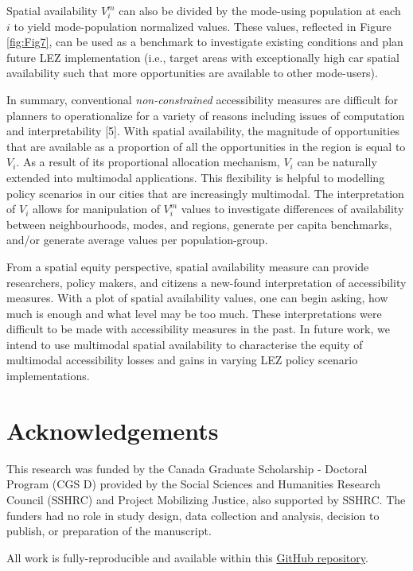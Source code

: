 \documentclass[10pt,letterpaper]{article}
\begin{document}
Spatial availability \(V_i^m\) can also be divided by the mode-using
population at each \(i\) to yield mode-population normalized values.
These values, reflected in Figure \ref{fig:Fig7}, can be used as a
benchmark to investigate existing conditions and plan future LEZ
implementation (i.e., target areas with exceptionally high car spatial
availability such that more opportunities are available to other
mode-users).

In summary, conventional \emph{non-constrained} accessibility measures
are difficult for planners to operationalize for a variety of reasons
including issues of computation and interpretability {[}5{]}. With
spatial availability, the magnitude of opportunities that are available
as a proportion of all the opportunities in the region is equal to
\(V_i\). As a result of its proportional allocation mechanism, \(V_i\)
can be naturally extended into multimodal applications. This flexibility
is helpful to modelling policy scenarios in our cities that are
increasingly multimodal. The interpretation of \(V_i\) allows for
manipulation of \(V_i^m\) values to investigate differences of
availability between neighbourhoods, modes, and regions, generate per
capita benchmarks, and/or generate average values per population-group.

From a spatial equity perspective, spatial availability measure can
provide researchers, policy makers, and citizens a new-found
interpretation of accessibility measures. With a plot of spatial
availability values, one can begin asking, how much is enough and what
level may be too much. These interpretations were difficult to be made
with accessibility measures in the past. In future work, we intend to
use multimodal spatial availability to characterise the equity of
multimodal accessibility losses and gains in varying LEZ policy scenario
implementations.

\hypertarget{acknowledgements}{%
\section{Acknowledgements}\label{acknowledgements}}

This research was funded by the Canada Graduate Scholarship - Doctoral
Program (CGS D) provided by the Social Sciences and Humanities Research
Council (SSHRC) and Project Mobilizing Justice, also supported by SSHRC.
The funders had no role in study design, data collection and analysis,
decision to publish, or preparation of the manuscript.

All work is fully-reproducible and available within this
\href{https://github.com/soukhova/Multimodal-spatial-availability}{GitHub
repository}.
\end{document}
